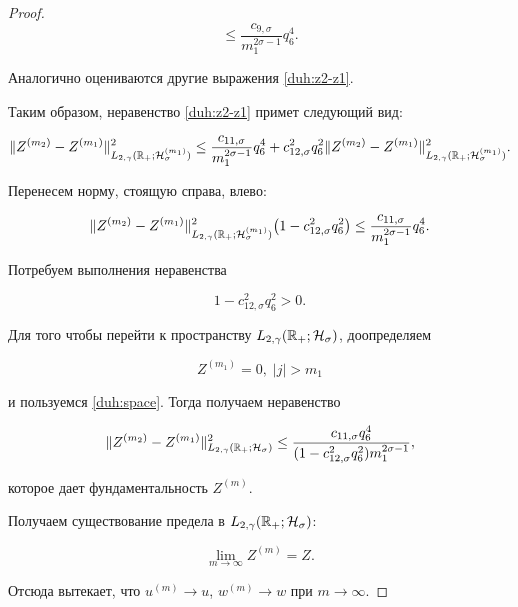 \begin{proof}
\begin{equation}
\le\frac{c_{9,\sigma}}{m_1^{2\sigma-1}}q_6^4.

\label{duh:estF}

\end{equation}



Аналогично оцениваются другие выражения \eqref{duh:z2-z1}.

Таким образом, неравенство \eqref{duh:z2-z1} примет следующий вид:

$$

\|Z^{(m_2)}-Z^{(m_1)}\|^2_{L_{2,\gamma}(\mathbb R_{+};{\cal H}^{(m_1)}_{\sigma})}

\le \frac{c_{11,\sigma}}{m_1^{2\sigma-1}}q_6^4+c_{12,\sigma}^2 q_6^2 \|Z^{(m_2)}-Z^{(m_1)} \|^2_{L_{2,\gamma}(\mathbb R_{+};{\cal H}^{(m_1)}_{\sigma})}.

$$

Перенесем норму, стоящую справа, влево:

$$

\|Z^{(m_2)}-Z^{(m_1)}\|^2_{L_{2,\gamma}(\mathbb R_{+};{\cal H}^{(m_1)}_{\sigma})}\bigl(1-c_{12,\sigma}^2 q_6^2\bigr)

\le \frac{c_{11,\sigma}}{m_1^{2\sigma-1}}q_6^4.

$$

Потребуем выполнения неравенства

$$

1-c_{12,\sigma}^2 q_6^2>0.

$$

Для того чтобы перейти к пространству $L_{2,\gamma}(\mathbb R_{+};{\cal H}_{\sigma})$, доопределяем 

\begin{equation}

Z^{(m_1)}=0,  \; |j|> m_1 

\label{duh:def}

\end{equation}

и пользуемся \eqref{duh:space}. Тогда получаем неравенство

$$

\|Z^{(m_2)}-Z^{(m_1)}\|^2_{L_{2,\gamma}(\mathbb R_{+};{\cal H}_{\sigma})}

\le \frac{c_{11,\sigma}q_6^4}{(1-c_{12,\sigma}^2 q_6^2)m_1^{2\sigma-1}},

$$

которое дает фундаментальность  $Z^{(m)}$. 

Получаем существование предела в $ L_{2,\gamma}(\mathbb R_{+};{\cal H}_{\sigma})$:

$$

\lim\limits_{m \to \infty} Z^{(m)}=Z .

$$ 

Отсюда вытекает, что $u^{(m)}\to u$, $w^{(m)}\to w$ при $ m\to \infty$.

\end{proof}




